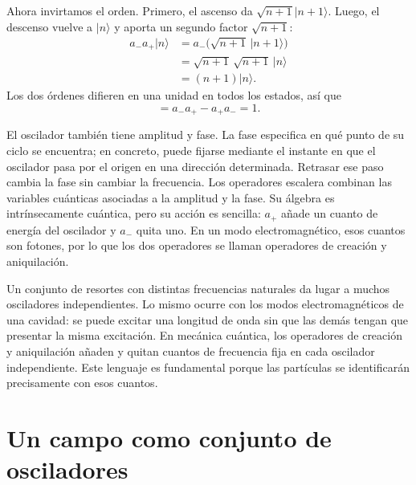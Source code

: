 Ahora invirtamos el orden. Primero, el ascenso da \(\sqrt{n+1}|n+1\rangle\). Luego, el descenso vuelve a \(|n\rangle\) y aporta un segundo factor \(\sqrt{n+1}\):
\begin{align}
a_-a_+|n\rangle
&=a_-\bigl(\sqrt{n+1}\,|n+1\rangle\bigr)\\
&=\sqrt{n+1}\,\sqrt{n+1}\,|n\rangle\\
&=(n+1)|n\rangle.
\end{align}
Los dos órdenes difieren en una unidad en todos los estados, así que
\begin{equation}
[a_-,a_+]=a_-a_+-a_+a_-=1.
\end{equation}

El oscilador también tiene amplitud y fase. La fase especifica en qué punto de su ciclo se encuentra; en concreto, puede fijarse mediante el instante en que el oscilador pasa por el origen en una dirección determinada. Retrasar ese paso cambia la fase sin cambiar la frecuencia. Los operadores escalera combinan las variables cuánticas asociadas a la amplitud y la fase. Su álgebra es intrínsecamente cuántica, pero su acción es sencilla: \(a_+\) añade un cuanto de energía del oscilador y \(a_-\) quita uno. En un modo electromagnético, esos cuantos son fotones, por lo que los dos operadores se llaman operadores de creación y aniquilación.

\begin{classroomqa}
\end{classroomqa}

Un conjunto de resortes con distintas frecuencias naturales da lugar a muchos osciladores independientes. Lo mismo ocurre con los modos electromagnéticos de una cavidad: se puede excitar una longitud de onda sin que las demás tengan que presentar la misma excitación. En mecánica cuántica, los operadores de creación y aniquilación añaden y quitan cuantos de frecuencia fija en cada oscilador independiente. Este lenguaje es fundamental porque las partículas se identificarán precisamente con esos cuantos.

\section{Un campo como conjunto de osciladores}


